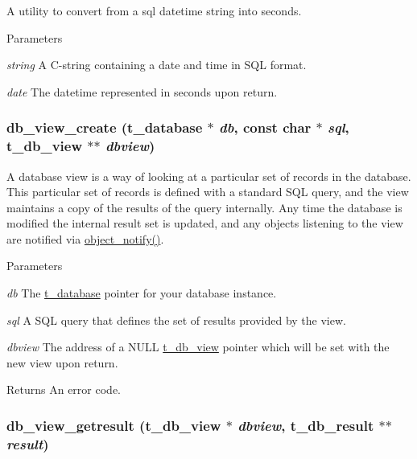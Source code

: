 A utility to convert from a sql datetime string into seconds. 
\begin{DoxyParams}{Parameters}
\item[{\em string}]A C-\/string containing a date and time in SQL format. \item[{\em date}]The datetime represented in seconds upon return. \end{DoxyParams}
\hypertarget{group__database_ga70b24ae188489537db137f67f5d01388}{
\subsubsection[{db\_\-view\_\-create}]{ db\_\-view\_\-create ({\bf t\_\-database} $\ast$ {\em db}, \/  const char $\ast$ {\em sql}, \/  {\bf t\_\-db\_\-view} $\ast$$\ast$ {\em dbview})}}
\label{group__database_ga70b24ae188489537db137f67f5d01388}


A database view is a way of looking at a particular set of records in the database. This particular set of records is defined with a standard SQL query, and the view maintains a copy of the results of the query internally. Any time the database is modified the internal result set is updated, and any objects listening to the view are notified via \hyperlink{group__obj_ga6297b81c3a70f7fb2201c7262e96bba3}{object\_\-notify()}.


\begin{DoxyParams}{Parameters}
\item[{\em db}]The \hyperlink{group__database_gad832ea0e5fc292661fd20046cee7e3b3}{t\_\-database} pointer for your database instance. \item[{\em sql}]A SQL query that defines the set of results provided by the view. \item[{\em dbview}]The address of a NULL \hyperlink{group__database_gac9ea40a519578e26498dd61ea98b5cf2}{t\_\-db\_\-view} pointer which will be set with the new view upon return. \end{DoxyParams}
\begin{DoxyReturn}{Returns}
An error code. 
\end{DoxyReturn}
\hypertarget{group__database_ga40de375c540b3551ba42d7a2643aa89f}{
\subsubsection[{db\_\-view\_\-getresult}]{ db\_\-view\_\-getresult ({\bf t\_\-db\_\-view} $\ast$ {\em dbview}, \/  {\bf t\_\-db\_\-result} $\ast$$\ast$ {\em result})}}
\label{group__database_ga40de375c540b3551ba42d7a2643aa89f}


